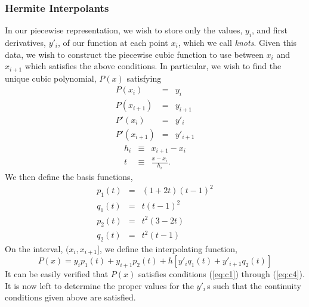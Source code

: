 \subsubsection{Hermite Interpolants}
In our piecewise representation, we wish to store only the values,
$y_i$, and first derivatives, $y'_i$, of our function at each point
$x_i$, which we call {\em knots}.  Given this data, we wish to
construct the piecewise cubic function to use between $x_i$ and
$x_{i+1}$ which satisfies the above conditions.  In particular, we
wish to find the unique cubic polynomial, $P(x)$ satisfying
\begin{eqnarray}
P(x_i)      & = & y_i      \label{eq:c1} \\
P(x_{i+1})  & = & y_{i+1}  \label{eq:c2} \\
P'(x_i)     & = & y'_i     \label{eq:c3} \\
P'(x_{i+1}) & = & y'_{i+1} \label{eq:c4}
\end{eqnarray}
\begin{eqnarray}
h_i & \equiv & x_{i+1} - {x_i} \\
t & \equiv & \frac{x-x_i}{h_i}.
\end{eqnarray}
We then define the basis functions,
\begin{eqnarray}
p_1(t) & = & (1+2t)(t-1)^2  \label{eq:p1}\\
q_1(t) & = & t (t-1)^2      \\
p_2(t) & = & t^2(3-2t)      \\
q_2(t) & = & t^2(t-1)      \label{eq:q2}
\end{eqnarray}
On the interval, $(x_i, x_{i+1}]$, we define the interpolating
function,
\begin{equation}
P(x) = y_i p_1(t) + y_{i+1}p_2(t) + h\left[y'_i q_1(t) + y'_{i+1} q_2(t)\right]
\end{equation}
It can be easily verified that $P(x)$ satisfies conditions (\ref{eq:c1})
through (\ref{eq:c4}).  It is now left to
determine the proper values for the $y'_i\,$s such that the continuity
conditions given above are satisfied.

